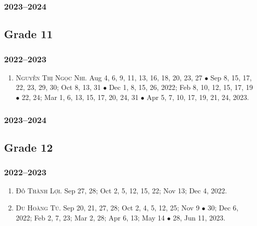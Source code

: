 \documentclass{article}
\begin{document}
\subsubsection{2023--2024}


\subsection{Grade 11}

\subsubsection{2022--2023}

\begin{enumerate}
	\item \textsc{Nguyễn Thị Ngọc Nhi.} {\sf[In]} Aug 4, 6, 9, 11, 13, 16, 18, 20, 23, 27 $\bullet$ Sep 8, 15, 17, 22, 23, 29, 30; Oct 8, 13, 31 $\bullet$ Dec 1, 8,  15, 26, 2022; Feb 8, 10, 12, 15, 17, 19 $\bullet$ 22, 24; Mar 1, 6, 13, 15, 17, 20, 24, 31 $\bullet$ Apr 5, 7, 10, 17, 19, 21, 24, 2023.
\end{enumerate}

\subsubsection{2023--2024}


\subsection{Grade 12}

\subsubsection{2022--2023}

\begin{enumerate}
	\item \textsc{Đỗ Thành Lợi.} {\sf[In]} Sep 27, 28; Oct 2, 5, 12, 15, 22; Nov 13; Dec 4, 2022. {\sf[Out]}
	\item \textsc{Du Hoàng Tú.} {\sf[In]} Sep 20, 21, 27, 28; Oct 2, 4, 5, 12, 25; Nov 9 $\bullet$ 30; Dec 6, 2022; Feb 2, 7, 23; Mar 2, 28; Apr 6, 13; May 14 $\bullet$ 28, Jun 11, 2023. {\sf[Out]}
\end{enumerate}
\end{document}
